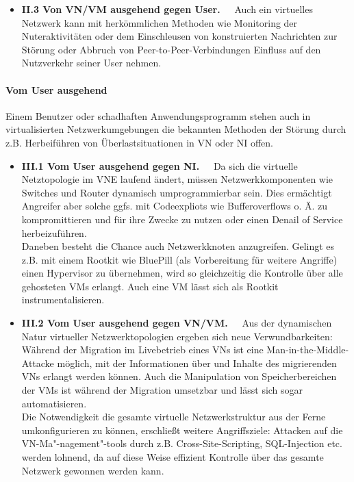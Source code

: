 \begin{itemize}
\item \textbf{II.3 Von VN/VM ausgehend gegen User.~~}
Auch ein virtuelles Netzwerk kann mit herkömmlichen Methoden wie Monitoring der Nuteraktivitäten oder dem Einschleusen von konstruierten Nachrichten zur Störung oder Abbruch von Peer-to-Peer-Verbindungen Einfluss auf den Nutzverkehr seiner User nehmen.
\end{itemize}



\paragraph{Vom User ausgehend}
\label{parag:vonUser}
Einem Benutzer oder schadhaften Anwendungsprogramm stehen auch in virtualisierten Netzwerkumgebungen die bekannten Methoden der Störung durch z.B. Herbeiführen von Überlastsituationen in VN oder NI offen.

\begin{itemize}
	\item \textbf{III.1 Vom User ausgehend gegen NI.~~}
	Da sich die virtuelle Netztopologie im VNE laufend ändert, müssen Netzwerkkomponenten wie Switches und Router dynamisch umprogrammierbar sein. Dies ermächtigt Angreifer aber solche ggfs. mit Codeexpliots wie Bufferoverflows o. Ä. zu kompromittieren und für ihre Zwecke zu nutzen oder einen Denail of Service herbeizuführen.\\
	Daneben besteht die Chance auch Netzwerkknoten anzugreifen. Gelingt es z.B. mit einem Rootkit wie BluePill \cite{rutkowska2008bluepilling} (als Vorbereitung für weitere Angriffe) einen Hypervisor zu übernehmen, wird so gleichzeitig die Kontrolle über alle gehosteten VMs erlangt. Auch eine VM lässt sich als Rootkit instrumentalisieren. \cite{wu2010network}
	\item \textbf{III.2 Vom User ausgehend gegen VN/VM.~~}
	Aus der dynamischen Natur virtueller Netzwerktopologien ergeben sich neue Verwundbarkeiten: Während der Migration im Livebetrieb eines VNs ist eine Man-in-the-Middle-Attacke möglich, mit der Informationen über und Inhalte des migrierenden VNs erlangt werden können. \cite{natarajansecurity} Auch die Manipulation von Speicherbereichen der VMs ist während der Migration umsetzbar und lässt sich sogar automatisieren. \cite{oberheide2008empirical}\\
	Die Notwendigkeit die gesamte virtuelle Netzwerkstruktur aus der Ferne umkonfigurieren zu können, erschließt weitere Angriffsziele: Attacken auf die VN-Ma"-nagement"-tools durch z.B. Cross-Site-Scripting, SQL-Injection etc. werden lohnend, da auf diese Weise effizient Kontrolle über das gesamte Netzwerk gewonnen werden kann.	
\end{itemize}



